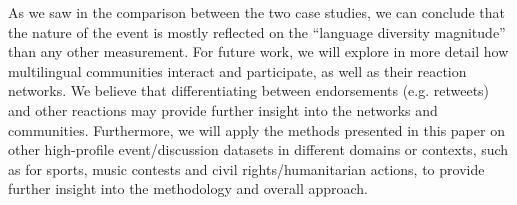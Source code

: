 \documentclass{llncs}
\begin{document}
As we saw in the comparison between the two case studies, we can
conclude that the nature of the event is mostly reflected on the
``language diversity magnitude'' than any other measurement.  For
future work, we will explore in more detail how multilingual
communities interact and participate, as well as their reaction
networks. We believe that differentiating between endorsements
(e.g. retweets) and other reactions may provide further insight into
the networks and communities. Furthermore, we will apply the methods
presented in this paper on other high-profile event/discussion
datasets in different domains or contexts, such as for sports, music
contests and civil rights/humanitarian actions, to provide further
insight into the methodology and overall approach.





\end{document}
